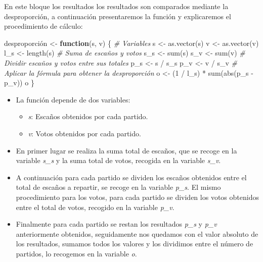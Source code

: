 \documentclass[12pt,a4paper,]{book}
\newenvironment{Shaded}{\begin{snugshade}}{\end{snugshade}}
\newcommand{\CommentTok}[1]{\textcolor[rgb]{0.56,0.35,0.01}{\textit{#1}}}
\newcommand{\ControlFlowTok}[1]{\textcolor[rgb]{0.13,0.29,0.53}{\textbf{#1}}}
\newcommand{\DecValTok}[1]{\textcolor[rgb]{0.00,0.00,0.81}{#1}}
\newcommand{\FunctionTok}[1]{\textcolor[rgb]{0.00,0.00,0.00}{#1}}
\newcommand{\NormalTok}[1]{#1}
\newcommand{\OtherTok}[1]{\textcolor[rgb]{0.56,0.35,0.01}{#1}}
\newcommand{\SpecialCharTok}[1]{\textcolor[rgb]{0.00,0.00,0.00}{#1}}
\providecommand{\tightlist}{%
  \setlength{\itemsep}{0pt}\setlength{\parskip}{0pt}}
\numberwithin{dummy}{section}
\theoremstyle{ocrenumbox}
\theoremstyle{blacknumex}
\theoremstyle{blacknumbox}
\theoremstyle{ocrenum}
\theoremstyle{ocrenum}
\begin{document}
En este bloque los resultados los resultados son comparados mediante la
desproporción, a continuación presentaremos la función y explicaremos el
procedimiento de cálculo:

\begin{Shaded}
\begin{Highlighting}[]
\NormalTok{desproporción }\OtherTok{\textless{}{-}}
  \ControlFlowTok{function}\NormalTok{(s, v) \{  }\CommentTok{\# Variables}
\NormalTok{    s }\OtherTok{\textless{}{-}} \FunctionTok{as.vector}\NormalTok{(s)}
\NormalTok{    v }\OtherTok{\textless{}{-}} \FunctionTok{as.vector}\NormalTok{(v)}
\NormalTok{    l\_s }\OtherTok{\textless{}{-}} \FunctionTok{length}\NormalTok{(s)}
    \CommentTok{\# Suma de escaños y votos}
\NormalTok{    s\_s }\OtherTok{\textless{}{-}} \FunctionTok{sum}\NormalTok{(s)   }
\NormalTok{    s\_v }\OtherTok{\textless{}{-}} \FunctionTok{sum}\NormalTok{(v)}
    \CommentTok{\# Dividir escaños y votos entre sus totales}
\NormalTok{    p\_s }\OtherTok{\textless{}{-}}\NormalTok{ s }\SpecialCharTok{/}\NormalTok{ s\_s}
\NormalTok{    p\_v }\OtherTok{\textless{}{-}}\NormalTok{ v }\SpecialCharTok{/}\NormalTok{ s\_v}
    \CommentTok{\# Aplicar la fórmula para obtener la desproporción}
\NormalTok{    o }\OtherTok{\textless{}{-}}\NormalTok{ (}\DecValTok{1} \SpecialCharTok{/}\NormalTok{ l\_s) }\SpecialCharTok{*} \FunctionTok{sum}\NormalTok{(}\FunctionTok{abs}\NormalTok{(p\_s }\SpecialCharTok{{-}}\NormalTok{ p\_v))}
\NormalTok{    o}
\NormalTok{  \}}
\end{Highlighting}
\end{Shaded}

\begin{itemize}
\tightlist
\item
  La función depende de dos variables:

  \begin{itemize}
  \tightlist
  \item
    \emph{s}: Escaños obtenidos por cada partido.
  \item
    \emph{v}: Votos obtenidos por cada partido.
  \end{itemize}
\item
  En primer lugar se realiza la suma total de escaños, que se recoge en
  la variable \emph{s\_s} y la suma total de votos, recogida en la
  variable \emph{s\_v}.
\item
  A continuación para cada partido se dividen los escaños obtenidos
  entre el total de escaños a repartir, se recoge en la variable
  \emph{p\_s}. El mismo procedimiento para los votos, para cada partido
  se dividen los votos obtenidos entre el total de votos, recogido en la
  variable \emph{p\_v}.
\item
  Finalmente para cada partido se restan los resultados \emph{p\_s} y
  \emph{p\_v} anteriormente obtenidos, seguidamente nos quedamos con el
  valor absoluto de los resultados, sumamos todos los valores y los
  dividimos entre el número de partidos, lo recogemos en la variable
  \emph{o}.
\end{itemize}
\end{document}
